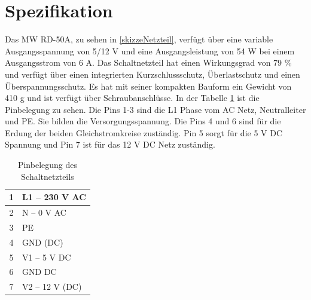 \section{Spezifikation}
Das MW RD-50A, zu sehen in \ref{skizzeNetzteil}, verfügt über eine variable Ausgangsspannung von 5/12 V und eine Ausgangsleistung von 54 W bei einem Ausgangsstrom von 6 A. Das Schaltnetzteil hat einen Wirkungsgrad von 79 \% und verfügt über einen integrierten Kurzschlussschutz, Überlastschutz und einen Überspannungsschutz. Es hat mit seiner kompakten Bauform ein Gewicht von 410 g und ist verfügt über Schraubanschlüsse. In der Tabelle \ref{tab:pinbelegung} ist die Pinbelegung zu sehen. Die Pins 1-3 sind die L1 Phase vom AC Netz, Neutralleiter und PE. Sie bilden die Versorgungsspannung. Die Pins 4 und 6 sind für die Erdung der beiden Gleichstromkreise zuständig. Pin 5 sorgt für die 5 V DC Spannung und Pin 7 ist für das 12 V DC Netz zuständig.\cite{MeanWell:2014} \cite{Reichelt:2025}
\begin{table}[H]
	\centering
	\caption{Pinbelegung des Schaltnetzteils}
	\label{tab:pinbelegung}
	\begin{tabular}{c|l}
		\hline
		1  & L1 – 230 V AC \\
		\hline
		2  & N – 0 V AC    \\
		\hline
		3  & PE            \\
		\hline
		4  & GND (DC)   \\
		\hline
		5  & V1 – 5 V DC      \\
		\hline
		6  & GND DC  \\
		\hline
		7  & V2 – 12 V (DC)      \\
	\end{tabular}
\end{table}

